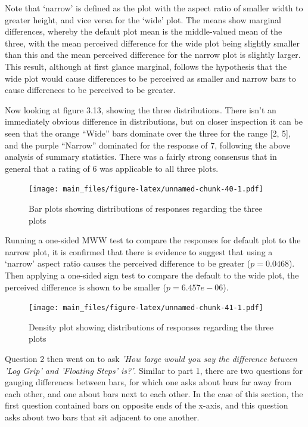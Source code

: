 \documentclass[
  11pt,
]{book}
\begin{document}
Note that `narrow' is defined as the plot with the aspect ratio of
smaller width to greater height, and vice versa for the `wide' plot. The
means show marginal differences, whereby the default plot mean is the
middle-valued mean of the three, with the mean perceived difference for
the wide plot being slightly smaller than this and the mean perceived
difference for the narrow plot is slightly larger. This result, although
at first glance marginal, follows the hypothesis that the wide plot
would cause differences to be perceived as smaller and narrow bars to
cause differences to be perceived to be greater.

Now looking at figure 3.13, showing the three distributions. There isn't
an immediately obvious difference in distributions, but on closer
inspection it can be seen that the orange ``Wide'' bars dominate over
the three for the range {[}2, 5{]}, and the purple ``Narrow'' dominated
for the response of 7, following the above analysis of summary
statistics. There was a fairly strong consensus that in general that a
rating of 6 was applicable to all three plots.

\begin{figure}
\centering
\texttt{[image: main\_files/figure-latex/unnamed-chunk-40-1.pdf]}
\caption{Bar plots showing distributions of responses regarding the
three plots}
\end{figure}

Running a one-sided MWW test to compare the responses for default plot
to the narrow plot, it is confirmed that there is evidence to suggest
that using a `narrow' aspect ratio causes the perceived difference to be
greater (\(p=0.0468\)). Then applying a one-sided sign test to compare
the default to the wide plot, the perceived difference is shown to be
smaller (\(p=6.457e-06\)).

\begin{figure}
\centering
\texttt{[image: main\_files/figure-latex/unnamed-chunk-41-1.pdf]}
\caption{Density plot showing distributions of responses regarding the
three plots}
\end{figure}

Question 2 then went on to ask
\textit{'How large would you say the difference between 'Log Grip' and 'Floating Steps' is?'}.
Similar to part 1, there are two questions for gauging differences
between bars, for which one asks about bars far away from each other,
and one about bars next to each other. In the case of this section, the
first question contained bars on opposite ends of the x-axis, and this
question asks about two bars that sit adjacent to one another.
\end{document}
